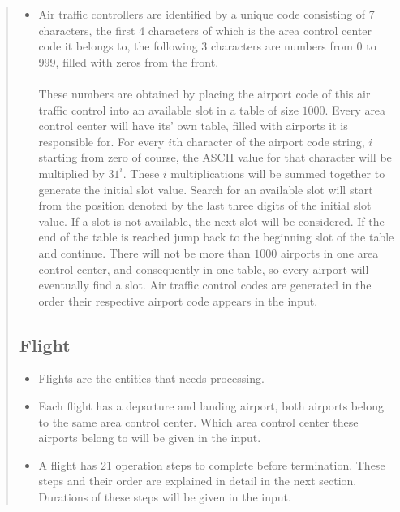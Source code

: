 \documentclass[10pt]{article}
\begin{document}
\begin{quote}
\begin{itemize}
    \item Air traffic controllers are identified by a unique code consisting of 7 characters, the first 4 characters of which is the area control center code it belongs to, the following 3 characters are numbers from $0$ to $999$, filled with zeros from the front. 
    \\ \\ 
    These numbers are obtained by placing the airport code of this air traffic control into an available slot in a table of size $1000$. Every area control center will have its' own table, filled with airports it is responsible for. For every $i$th character of the airport code string, $i$ starting from zero of course, the ASCII value for that character will be multiplied by $31^{i}$. These $i$ multiplications will be summed together to generate the initial slot value. Search for an available slot will start from the position denoted by the last three digits of the initial slot value. If a slot is not available, the next slot will be considered. If the end of the table is reached jump back to the beginning slot of the table and continue. There will not be more than $1000$ airports in one area control center, and consequently in one table, so every airport will eventually find a slot. Air traffic control codes are generated in the order their respective airport code appears in the input. 
    
    \end{itemize}
    
\subsection{\large\textbf{Flight}}
    
    
    \begin{itemize}

    \item Flights are the entities that needs processing. 
    
    \item Each flight has a departure and landing airport, both airports belong to the same area control center. Which area control center these airports belong to will be given in the input.
    
    \item A flight has 21 operation steps to complete before termination. These steps and their order are explained in detail in the next section. Durations of these steps will be given in the input. 
    

\end{itemize}
\end{quote}
\end{document}

